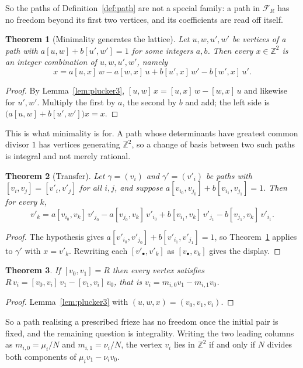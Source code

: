 \documentclass[11pt]{article}
\theoremstyle{plain}
\newtheorem{theorem}{Theorem}[section]
\theoremstyle{definition}
\newcommand{\Z}{\mathbb{Z}}
\begin{document}
So the paths of Definition~\ref{def:path} are not a special family: a path in $\mathcal F_R$
has no freedom beyond its first two vertices, and its coefficients are read off itself.

\begin{theorem}[Minimality generates the lattice]\label{thm:minspan}
Let $u,w,u',w'$ be vertices of a path with $a[u,w]+b[u',w']=1$ for some integers $a,b$. Then
every $x\in\Z^2$ is an integer combination of $u,w,u',w'$, namely
\[
  x=a[u,x]\,w-a[w,x]\,u+b[u',x]\,w'-b[w',x]\,u' .
\]
\end{theorem}

\begin{proof}
By Lemma~\ref{lem:plucker3}, $[u,w]\,x=[u,x]\,w-[w,x]\,u$ and likewise for $u',w'$.
Multiply the first by $a$, the second by $b$ and add; the left side is
$\bigl(a[u,w]+b[u',w']\bigr)x=x$.
\end{proof}

This is what minimality is for. A path whose determinants have greatest common divisor $1$
has vertices generating $\Z^2$, so a change of basis between two such paths is integral and
not merely rational.

\begin{theorem}[Transfer]\label{thm:transfer}
Let $\gamma=(v_i)$ and $\gamma'=(v'_i)$ be paths with $[v_i,v_j]=[v'_i,v'_j]$ for all $i,j$,
and suppose $a[v_{i_0},v_{j_0}]+b[v_{i_1},v_{j_1}]=1$. Then for every $k$,
\[
  v'_k=a[v_{i_0},v_k]\,v'_{j_0}-a[v_{j_0},v_k]\,v'_{i_0}
        +b[v_{i_1},v_k]\,v'_{j_1}-b[v_{j_1},v_k]\,v'_{i_1}.
\]
\end{theorem}

\begin{proof}
The hypothesis gives $a[v'_{i_0},v'_{j_0}]+b[v'_{i_1},v'_{j_1}]=1$, so
Theorem~\ref{thm:minspan} applies to $\gamma'$ with $x=v'_k$. Rewriting each
$[v'_\bullet,v'_k]$ as $[v_\bullet,v_k]$ gives the display.
\end{proof}

\begin{theorem}\label{thm:pathrecon}
If $[v_0,v_1]=R$ then every vertex satisfies $R\,v_i=[v_0,v_i]\,v_1-[v_1,v_i]\,v_0$, that is
$v_i=m_{i,0}v_1-m_{i,1}v_0$.
\end{theorem}

\begin{proof}
Lemma~\ref{lem:plucker3} with $(u,w,x)=(v_0,v_1,v_i)$.
\end{proof}

So a path realising a prescribed frieze has no freedom once the initial pair is fixed, and
the remaining question is integrality. Writing the two leading columns as
$m_{i,0}=\mu_i/N$ and $m_{i,1}=\nu_i/N$, the vertex $v_i$ lies in $\Z^2$ if and only if $N$
divides both components of $\mu_iv_1-\nu_iv_0$.
\end{document}
